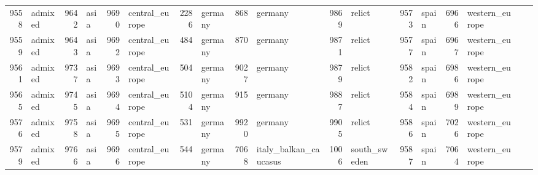 \begin{table}[h]
{\begin{tabular}{rl|rl|rl|rl|rl|rl|rl|rl|rl}
			9558                   & admixed         & 9642                   & asia            & 9690                   & central\_europe & 2286                   & germany         & 868                    & germany                 & 9869                   & relict                  & 9573                   & spain           & 6966                   & western\_europe &                          &                 \\
			9559                   & admixed         & 9643                   & asia            & 9692                   & central\_europe & 484                    & germany         & 870                    & germany                 & 9871                   & relict                  & 9577                   & spain           & 6967                   & western\_europe &                          &                 \\
			9561                   & admixed         & 9737                   & asia            & 9693                   & central\_europe & 504                    & germany         & 9027                   & germany                 & 9879                   & relict                  & 9582                   & spain           & 6986                   & western\_europe &                          &                 \\
			9565                   & admixed         & 9745                   & asia            & 9694                   & central\_europe & 5104                   & germany         & 915                    & germany                 & 9887                   & relict                  & 9584                   & spain           & 6989                   & western\_europe &                          &                 \\
			9576                   & admixed         & 9758                   & asia            & 9695                   & central\_europe & 531                    & germany         & 9920                   & germany                 & 9905                   & relict                  & 9586                   & spain           & 7026                   & western\_europe &                          &                 \\
			9579                   & admixed         & 9766                   & asia            & 9696                   & central\_europe & 544                    & germany         & 7068                   & italy\_balkan\_caucasus & 1006                   & south\_sweden           & 9587                   & spain           & 7064                   & western\_europe &                          &                 \\

\end{tabular}}
\end{table}
